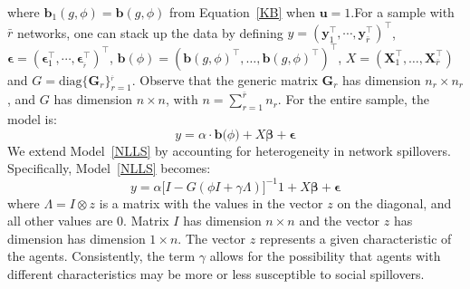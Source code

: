 \documentclass[nojss]{jss}
\begin{document}
%
where $\boldsymbol{b}_{1}\left(g,\phi \right) =\boldsymbol{b}\left(g,\phi
\right) $ from Equation~\ref{KB} when $\boldsymbol{u}=1$.\newline For a
sample with $\bar{r}$ networks, one can stack up the data by defining
$y=(\mathbf{y}_{1}^\top,\cdots,\mathbf{y}_{\bar{r}}^\top)^\top$,
$\mathbf{\epsilon }=(\boldsymbol{\epsilon }_{1}^\top,\cdots
,\boldsymbol{\epsilon }_{_{\bar{r}}}^\top)^\top$,
$\mathbf{b}(\phi)=\left(\boldsymbol{b}\left(g,\phi
\right)^\top,\dots ,\boldsymbol{b}\left(g,\phi\right)^\top\right)^\top$,
$X=(\boldsymbol{X}_{1}^\top,\dots ,\boldsymbol{X}_{\overline{r}}^\top)$ and
$G=\mathrm{diag}\{\boldsymbol{G}_{r}\}_{r=1}^{_{\bar{r}}}$.  Observe that
the generic matrix $\boldsymbol{G}_{r}$ has dimension $n_{r}\times n_{r}$,
and $G$ has dimension $n\times n$, with $n=\sum_{r=1}^{\bar{r}} n_{r}$.  For
the entire sample, the model is:
%
\begin{equation}
y=\alpha \cdot \mathbf{b(}\phi \mathbf{)}+X\mathbf{\beta}+\mathbf{\epsilon }
\label{NLLS}
\end{equation}
%
We extend Model~\ref{NLLS} by accounting for heterogeneity in network
spillovers.  Specifically, Model~\ref{NLLS} becomes:
%
\begin{equation}
y=\alpha \lbrack I-G(\phi I+\gamma \Lambda )]^{-1}1+X\mathbf{\beta
}+\mathbf{\epsilon }
\label{BP_2}
\end{equation}
%
where $\Lambda =I\otimes z$ is a matrix with the values in the vector $z$ on
the diagonal, and all other values are 0.  Matrix $I$ has dimension $n
\times n$ and the vector $z$ has dimension has dimension $1\times n$.  The
vector $z$ represents a given characteristic of the agents.  Consistently,
the term $\gamma$ allows for the possibility that agents with different
characteristics may be more or less susceptible to social spillovers.
\end{document}

